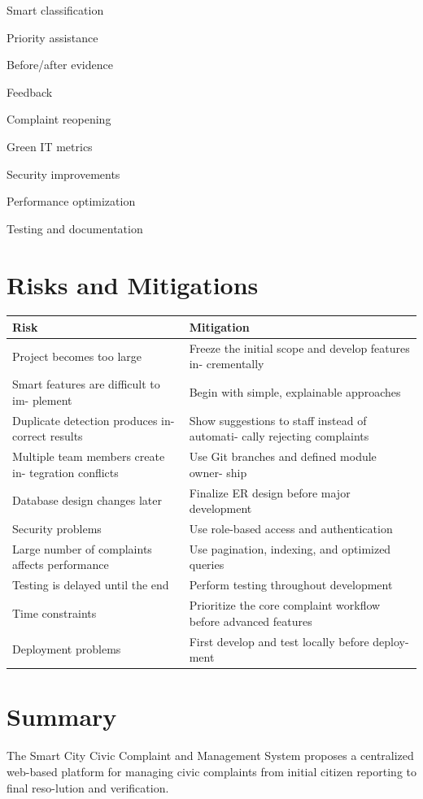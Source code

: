\documentclass[12pt,a4paper]{article}
\begin{document}
Smart classification

Priority assistance

Before/after evidence

Feedback

Complaint reopening

Green IT metrics

Security improvements

Performance optimization

Testing and documentation

\section{Risks and Mitigations}

\begin{longtable}{@{}p{} p{}@{}}
\toprule
\textbf{Risk} & \textbf{Mitigation} \\
\midrule
\endhead
Project becomes too large & Freeze the initial scope and develop features in-
crementally \\
Smart features are difficult to im-
plement & Begin with simple, explainable approaches \\
Duplicate detection produces in-
correct results & Show suggestions to staff instead of automati-
cally rejecting complaints \\
Multiple team members create in-
tegration conflicts & Use Git branches and defined module owner-
ship \\
Database design changes later & Finalize ER design before major development \\
Security problems & Use role-based access and authentication \\
Large number of complaints affects
performance & Use	pagination,	indexing,	and	optimized
queries \\
Testing is delayed until the end & Perform testing throughout development \\
Time constraints & Prioritize the core complaint workflow before
advanced features \\
Deployment problems & First develop and test locally before deploy-
ment \\

\bottomrule
\end{longtable}
\section{Summary}
The Smart City Civic Complaint and Management System proposes a centralized web-based platform for managing civic complaints from initial citizen reporting to final reso-lution and verification.
\end{document}
